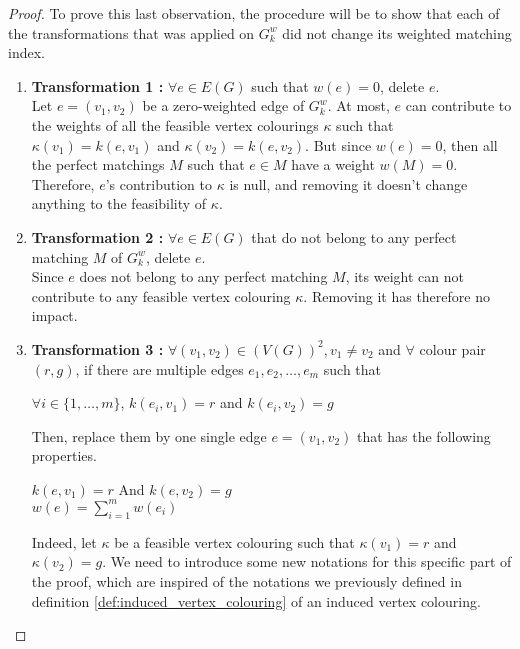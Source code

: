 \begin{proof}
    To prove this last observation, the procedure will be to show that each of the transformations that was applied on $G_k^w$ did not change its weighted matching index.

    \begin{enumerate}
        \item \textbf{Transformation 1 :} $\forall e \in E(G)$ such that $w(e) = 0$, delete $e$. \\
            Let $e = (v_1, v_2)$ be a zero-weighted edge of $G_k^w$. At most, $e$ can contribute to the weights of all the feasible vertex colourings $\kappa$ such that $\kappa(v_1) = k(e, v_1)$ and $\kappa(v_2) = k(e, v_2)$. But since $w(e) = 0$, then all the perfect matchings $M$ such that $e \in M$ have a weight $w(M) = 0$. Therefore, $e$'s contribution to $\kappa$ is null, and removing it doesn't change anything to the feasibility of $\kappa$.

        \item \textbf{Transformation 2 :} $\forall e \in E(G)$ that do not belong to any perfect matching $M$ of $G_k^w$, delete $e$. \\
            Since $e$ does not belong to any perfect matching $M$, its weight can not contribute to any feasible vertex colouring $\kappa$. Removing it has therefore no impact.

        \item \textbf{Transformation 3 :} $\forall (v_1, v_2) \in (V(G))^2, v_1 \neq v_2$ and $\forall$ colour pair $(r, g)$, if there are multiple edges $e_1, e_2, \dots, e_m$ such that
        \begin{center}
            $\forall i \in \{1, \dots, m\}$, $k(e_i, v_1) = r$ and $k(e_i, v_2) = g$
        \end{center}
        Then, replace them by one single edge $e = (v_1, v_2)$ that has the following properties.
        \begin{center}
            $k(e, v_1) = r$ And $k(e, v_2) = g$ \\
            $w(e) = \sum\limits_{i = 1}^m w(e_i)$
        \end{center}

            Indeed, let $\kappa$ be a feasible vertex colouring such that $\kappa(v_1) = r$ and $\kappa(v_2) = g$. We need to introduce some new notations for this specific part of the proof, which are inspired of the notations we previously defined in definition \ref{def:induced_vertex_colouring} of an induced vertex colouring.


\end{enumerate}
\end{proof}
